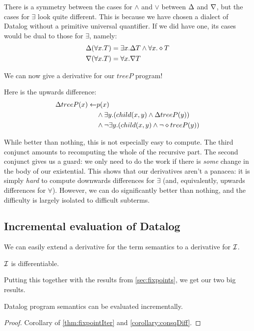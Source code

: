 There is a symmetry between the cases for $\wedge$ and $\vee$ between $\Delta$
and $\nabla$, but the cases for $\exists$ look quite different.
This is because we have chosen a dialect of Datalog without a primitive universal quantifier.
If we did have one, its cases would be dual to those for $\exists$, namely:
\begin{align*}
\Delta(\forall x.T) &= \exists x. \Delta T \wedge \forall x. \diamond T\\
\nabla(\forall x.T) &= \forall x. \nabla T
\end{align*}

We can now give a derivative for our $treeP$ program!

Here is the upwards difference:
\begin{align*}
  \Delta treeP(x) \leftarrow & p(x)\\
    &\wedge
    \exists y. (
      child(x, y)
      \wedge
      \Delta treeP(y)
    )\\
    &\wedge 
    \neg \exists y. (
      child(x, y)
      \wedge
      \neg \diamond treeP(y)
    )
\end{align*}

While better than nothing, this is not especially easy to compute. The third conjunct amounts to
recomputing the whole of the recursive part. The second conjunct gives us a
guard: we only need to do the work if there is \emph{some} change in the body of
our existential. This shows that our derivatives aren't a panacea: it is simply \emph{hard} to compute
downwards differences for $\exists$ (and, equivalently, upwards differences for
$\forall$). However, we can do significantly better than nothing, and the
difficulty is largely isolated to difficult subterms.

\subsection{Incremental evaluation of Datalog}

We can easily extend a derivative for the term semantics to a derivative for $\mathcal{I}$.

\begin{corollary}
\label{corollary:consqDiff}
  $\mathcal{I}$ is differentiable.
\end{corollary}

Putting this together with the results from \cref{sec:fixpoints}, we get our two
big results.

\begin{thm}
\label{thm:diffEval}
  Datalog program semantics can be evaluated incrementally.
\end{thm}
\ifproofs
\begin{proof}
  Corollary of \cref{thm:fixpointIter} and \cref{corollary:consqDiff}.
\end{proof}
\fi

